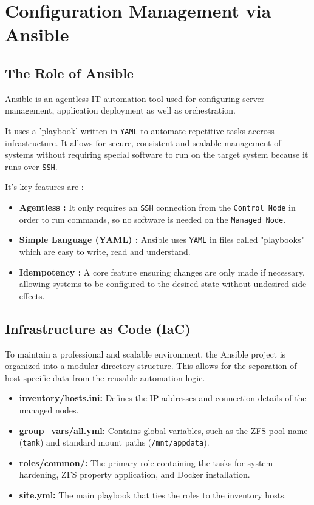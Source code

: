 \chapter{Configuration Management via Ansible}\label{chap:ansible}
\section{The Role of Ansible}
Ansible is an agentless IT automation tool used for configuring server management, application deployment as well as orchestration. 

It uses a 'playbook' written in \texttt{YAML} to automate repetitive tasks accross infrastructure. It allows for secure, consistent and scalable management of systems without requiring special software to run on the target system because it runs over \texttt{SSH}.

It's key features are :

\begin{itemize}
	\item \textbf{Agentless :} It only requires an \texttt{SSH} connection from the \texttt{Control Node} in order to run commands, so no software is needed on the \texttt{Managed Node}.
	\item \textbf{Simple Language (YAML) :} Ansible uses \texttt{YAML} in files called "playbooks" which are easy to write, read and understand.
	\item \textbf{Idempotency :} A core feature ensuring changes are only made if necessary, allowing systems to be configured to the desired state without undesired side-effects.
\end{itemize}

\newpage
\section{Infrastructure as Code (IaC)}
To maintain a professional and scalable environment, the Ansible project is organized into a modular directory structure. This allows for the separation of host-specific data from the reusable automation logic.

\begin{itemize}
	\item \textbf{inventory/hosts.ini:} Defines the IP addresses and connection details of the managed nodes.
	\item \textbf{group\_vars/all.yml:} Contains global variables, such as the ZFS pool name (\texttt{tank}) and standard mount paths (\texttt{/mnt/appdata}).
	\item \textbf{roles/common/:} The primary role containing the tasks for system hardening, ZFS property application, and Docker installation.
	\item \textbf{site.yml:} The main playbook that ties the roles to the inventory hosts.
\end{itemize}


